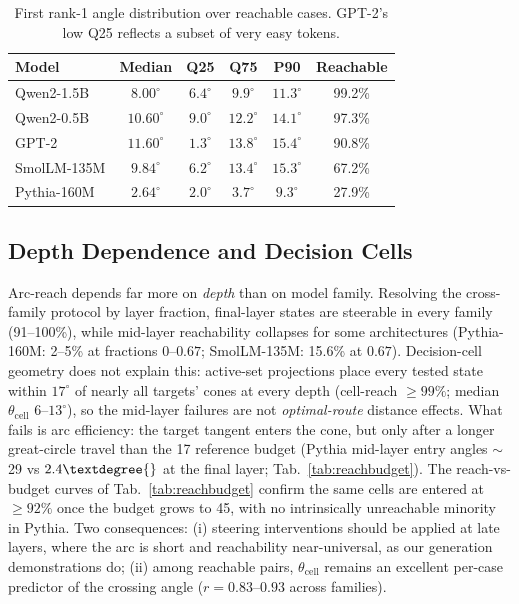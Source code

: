\documentclass{article}
\begin{document}
\begin{table}[h]
\centering
\begin{tabular}{lccccc}
\toprule
Model & Median & Q25 & Q75 & P90 & Reachable \\
\midrule
Qwen2-1.5B & $8.00^\circ$ & $6.4^\circ$ & $9.9^\circ$ & $11.3^\circ$ & 99.2\% \\
Qwen2-0.5B & $10.60^\circ$ & $9.0^\circ$ & $12.2^\circ$ & $14.1^\circ$ & 97.3\% \\
GPT-2 & $11.60^\circ$ & $1.3^\circ$ & $13.8^\circ$ & $15.4^\circ$ & 90.8\% \\
SmolLM-135M & $9.84^\circ$ & $6.2^\circ$ & $13.4^\circ$ & $15.3^\circ$ & 67.2\% \\
Pythia-160M & $2.64^\circ$ & $2.0^\circ$ & $3.7^\circ$ & $9.3^\circ$ & 27.9\% \\
\bottomrule
\end{tabular}
\caption{First rank-1 angle distribution over reachable cases. GPT-2's low Q25
reflects a subset of very easy tokens.}
\label{tab:angles}
\end{table}

\subsection{Depth Dependence and Decision Cells}

Arc-reach depends far more on \emph{depth} than on model family. Resolving
the cross-family protocol by layer fraction, final-layer states are steerable
in every family (91--100\%), while mid-layer reachability collapses for some
architectures (Pythia-160M: 2--5\% at fractions $0$--$0.67$; SmolLM-135M:
15.6\% at $0.67$). Decision-cell geometry does not explain this: active-set
projections place every tested state within $17^\circ$ of nearly all targets'
cones at every depth (cell-reach $\geq 99\%$; median $\theta_{\mathrm{cell}}$
$6$--$13^\circ$), so the mid-layer failures are not \emph{optimal-route}
distance effects. What fails is arc efficiency: the target tangent enters the
cone, but only after a longer great-circle travel than the 17\textdegree{}
reference budget (Pythia mid-layer entry angles $\sim$29\textdegree{} vs
$2.4\textdegree{}$ at the final layer; Tab.~\ref{tab:reachbudget}). The
reach-vs-budget curves of Tab.~\ref{tab:reachbudget} confirm the same cells are entered at
$\geq 92\%$ once the budget grows to 45\textdegree{}, with no intrinsically
unreachable minority in Pythia. Two consequences: (i)
steering interventions should be applied at late layers, where the arc is short
and reachability near-universal, as our generation demonstrations do; (ii)
among reachable
pairs, $\theta_{\mathrm{cell}}$ remains an excellent per-case predictor of the
crossing angle ($r = 0.83$--$0.93$ across families).
\end{document}
